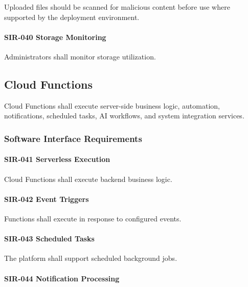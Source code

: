 Uploaded files should be scanned for malicious content before use where
supported by the deployment environment.

\paragraph{SIR-040 Storage Monitoring}

Administrators shall monitor storage utilization.


\subsection{Cloud Functions}

Cloud Functions shall execute server-side business logic, automation,
notifications, scheduled tasks, AI workflows, and system integration
services.


\subsubsection*{Software Interface Requirements}

\paragraph{SIR-041 Serverless Execution}

Cloud Functions shall execute backend business logic.

\paragraph{SIR-042 Event Triggers}

Functions shall execute in response to configured events.

\paragraph{SIR-043 Scheduled Tasks}

The platform shall support scheduled background jobs.

\paragraph{SIR-044 Notification Processing}

